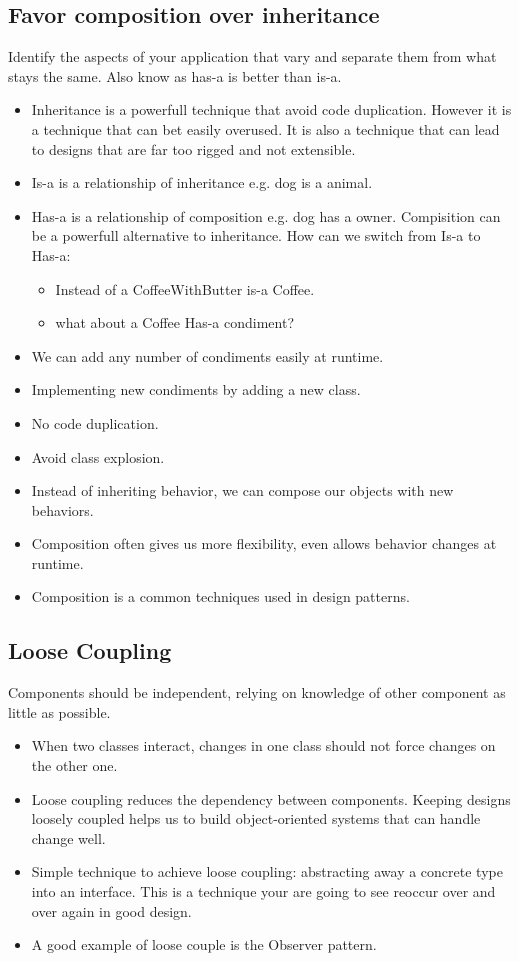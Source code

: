 \documentclass[11pt]{article}
\begin{document}
    \subsection{Favor composition over inheritance}
    Identify the aspects of your application that vary and separate them from what stays the same. Also know as has-a
    is better than is-a.
    \begin{itemize}
        \item Inheritance is a powerfull technique that avoid code duplication. However it is a technique that can
        bet easily overused. It is also a technique that can lead to designs that are far too rigged and not extensible.
        \item Is-a is a relationship of inheritance e.g. dog is a animal.
        \item Has-a is a relationship of composition e.g. dog has a owner. Compisition can be a powerfull alternative
        to inheritance. How can we switch from Is-a to Has-a:
        \begin{itemize}
            \item Instead of a CoffeeWithButter is-a Coffee.
            \item what about a Coffee Has-a condiment?
        \end{itemize}
        \item We can add any number of condiments easily at runtime.
        \item Implementing new condiments by adding a new class.
        \item No code duplication.
        \item Avoid class explosion.
        \item Instead of inheriting behavior, we can compose our objects with new behaviors.
        \item Composition often gives us more flexibility, even allows behavior changes at runtime.
        \item Composition is a common techniques used in design patterns.
    \end{itemize}

    \subsection{Loose Coupling}
    Components should be independent, relying on knowledge of other component as little as possible.
    \begin{itemize}
        \item When two classes interact, changes in one class should not force changes on the other one.
        \item Loose coupling reduces the dependency between components. Keeping designs loosely coupled helps us to build
        object-oriented systems that can handle change well.
        \item Simple technique to achieve loose coupling: abstracting away a concrete type into an interface. This
        is a technique your are going to see reoccur over and over again in good design.
        \item A good example of loose couple is the Observer pattern.
    \end{itemize}
\end{document}
